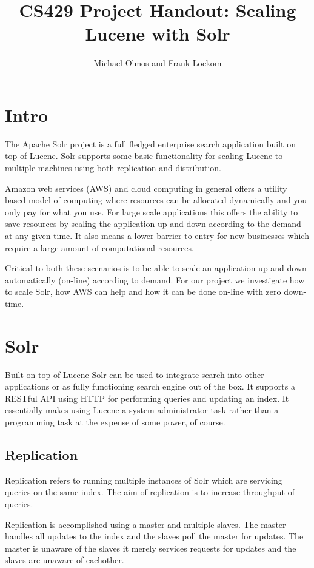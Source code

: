 \documentclass{article}
\author{Michael Olmos and Frank Lockom}
\title{CS429 Project Handout: Scaling Lucene with Solr}
\begin{document}
\maketitle
\section{Intro}
The Apache Solr project is a full fledged enterprise search
application built on top of Lucene. Solr supports some basic
functionality for scaling Lucene to multiple machines using both
replication and distribution. 

Amazon web services (AWS) and cloud computing in general offers a
utility based model of computing where resources can be allocated
dynamically and you only pay for what you use. For large scale
applications this offers the ability to save resources by scaling the
application up and down according to the demand at any given time. It
also means a lower barrier to entry for new businesses which require a
large amount of computational resources.

Critical to both these scenarios is to be able to scale an application
up and down automatically (on-line) according to demand. For our
project we investigate how to scale Solr, how AWS can help and how it
can be done on-line with zero down-time.

\section{Solr}
Built on top of Lucene Solr can be used to integrate search into other
applications or as fully functioning search engine out of the box. It
supports a RESTful API using HTTP for performing queries and updating
an index. It essentially makes using Lucene a system administrator
task rather than a programming task at the expense of some power, of
course.

\subsection{Replication}
Replication refers to running multiple instances of Solr which are
servicing queries on the same index. The aim of replication is to
increase throughput of queries.

Replication is accomplished using a master and multiple slaves. The
master handles all updates to the index and the slaves poll the master
for updates. The master is unaware of the slaves it merely services
requests for updates and the slaves are unaware of eachother.
\end{document}
